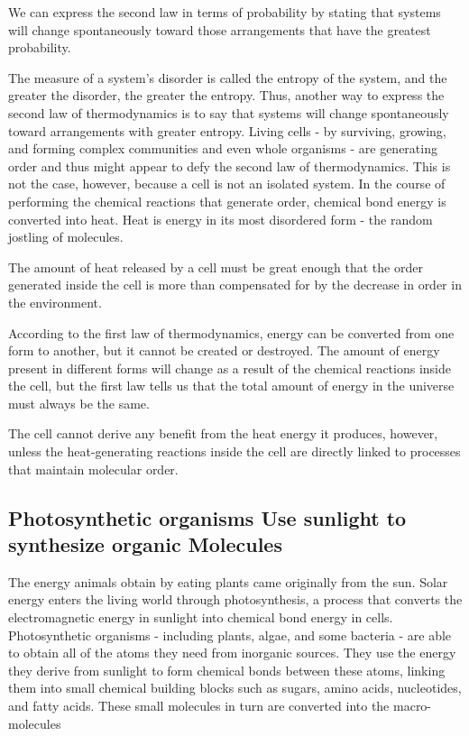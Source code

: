 We can express the second law in terms of probability by stating that
systems will change spontaneously toward those arrangements that have
the greatest probability.

The measure of a system’s disorder is called the entropy of the system,
and the greater the disorder, the greater the entropy. Thus, another way
to express the second law of thermodynamics is to say that systems will
change spontaneously toward arrangements with greater entropy.
Living cells - by surviving, growing, and forming complex communities and
even whole organisms - are generating order and thus might appear to
defy the second law of thermodynamics. This is not the case, however,
because a cell is not an isolated system.
In the course of performing the chemical reactions that generate
order, chemical bond energy is converted into heat. Heat is energy in its
most disordered form - the random jostling of molecules.

The amount of heat released by a cell must be great enough that the order
generated inside the cell is more than compensated for by the decrease
in order in the environment.

According to the first law of thermodynamics, energy can be converted from one form to
another, but it cannot be created or destroyed.
The amount of energy
present in different forms will change as a result of the chemical reactions
inside the cell, but the first law tells us that the total amount of
energy in the universe must always be the same.

The cell cannot derive any benefit from the heat energy it produces,
however, unless the heat-generating reactions inside the cell are directly
linked to processes that maintain molecular order.

\subsection{Photosynthetic organisms Use sunlight to synthesize organic Molecules}

The energy animals obtain by eating plants came originally from the sun.
Solar energy enters the living world through photosynthesis, a process
that converts the electromagnetic energy in sunlight into chemical bond
energy in cells. Photosynthetic organisms - including plants, algae, and
some bacteria - are able to obtain all of the atoms they need from inorganic sources.
They use the energy they derive from sunlight
to form chemical bonds between these atoms, linking them into small
chemical building blocks such as sugars, amino acids, nucleotides, and
fatty acids. These small molecules in turn are converted into the macro-molecules

